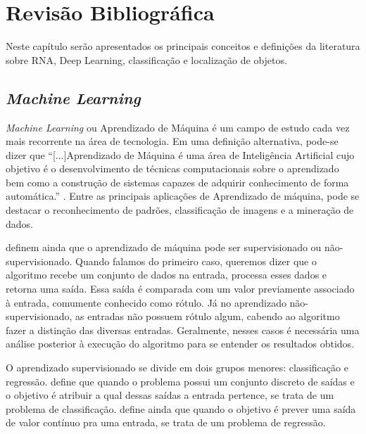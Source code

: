 \chapter{Revisão Bibliográfica}
\label{cap:2}
\vspace{-1.9cm}

Neste capítulo serão apresentados os principais conceitos e definições da literatura sobre \ac{RNA}, Deep Learning, classificação e localização de objetos.

\section{\textit{Machine Learning}}
\label{secao:2:1}
\vspace{-.6cm}

\textit{Machine Learning} ou Aprendizado de Máquina é um campo de estudo cada vez mais recorrente na área de tecnologia. Em uma definição alternativa, pode-se dizer que ``[...]Aprendizado de Máquina é uma área de Inteligência Artificial cujo objetivo é o desenvolvimento de técnicas computacionais sobre o aprendizado bem como a construção de sistemas capazes de adquirir conhecimento de forma automática.'' \cite{monard-2003}. Entre as principais aplicações de Aprendizado de máquina, pode se destacar o reconhecimento de padrões, classificação de imagens e a mineração de dados. 

 definem ainda que o aprendizado de máquina pode ser supervisionado ou não-supervisionado. Quando falamos do primeiro caso, queremos dizer que o algoritmo recebe um conjunto de dados na entrada, processa esses dados e retorna uma saída. Essa saída é comparada com um valor previamente associado à entrada, comumente conhecido como rótulo. Já no aprendizado não-supervisionado, as entradas não possuem rótulo algum, cabendo ao algoritmo fazer a distinção das diversas entradas. Geralmente, nesses casos é necessária uma análise posterior à execução do algoritmo para se entender os resultados obtidos.

O aprendizado supervisionado se divide em dois grupos menores: classificação e regressão.  define que quando o problema possui um conjunto discreto de saídas e o objetivo é atribuir a qual dessas saídas a entrada pertence, se trata de um problema de classificação.  define ainda que quando o objetivo é prever uma saída de valor contínuo pra uma entrada, se trata de um problema de regressão.

